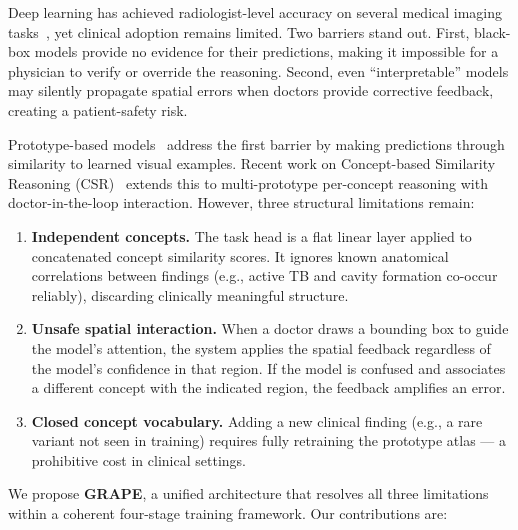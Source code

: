 \documentclass{article}
\begin{document}
Deep learning has achieved radiologist-level accuracy on several medical imaging tasks~\cite{rajpurkar2017chexnet,chen2020tbx11k}, yet clinical adoption remains limited. Two barriers stand out. First, black-box models provide no evidence for their predictions, making it impossible for a physician to verify or override the reasoning. Second, even ``interpretable'' models may silently propagate spatial errors when doctors provide corrective feedback, creating a patient-safety risk.

Prototype-based models~\cite{chen2019looks,donnelly2022deformable} address the first barrier by making predictions through similarity to learned visual examples. Recent work on Concept-based Similarity Reasoning (CSR)~\cite{csr2025} extends this to multi-prototype per-concept reasoning with doctor-in-the-loop interaction. However, three structural limitations remain:

\begin{enumerate}
    \item \textbf{Independent concepts.} The task head is a flat linear layer applied to concatenated concept similarity scores. It ignores known anatomical correlations between findings (e.g., active TB and cavity formation co-occur reliably), discarding clinically meaningful structure.
    \item \textbf{Unsafe spatial interaction.} When a doctor draws a bounding box to guide the model's attention, the system applies the spatial feedback regardless of the model's confidence in that region. If the model is confused and associates a different concept with the indicated region, the feedback amplifies an error.
    \item \textbf{Closed concept vocabulary.} Adding a new clinical finding (e.g., a rare variant not seen in training) requires fully retraining the prototype atlas — a prohibitive cost in clinical settings.
\end{enumerate}

We propose \textbf{GRAPE}, a unified architecture that resolves all three limitations within a coherent four-stage training framework. Our contributions are:
\end{document}
